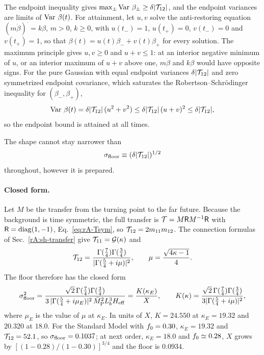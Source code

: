 \begin{rAproof}
The endpoint inequality gives $\max_\pm\operatorname{Var}\,\beta_\pm\geq\delta|\mathcal{T}_{12}|$, and the endpoint variances are limits of $\operatorname{Var}\,\beta(t)$.
For attainment, let $u,v$ solve the anti-restoring equation $(m\dot\beta)^{\boldsymbol\cdot}=k\beta$, $m>0$, $k\geq0$, with $u(t_-)=1$, $u(t_+)=0$, $v(t_-)=0$ and $v(t_+)=1$, so that $\beta(t)=u(t)\beta_-+v(t)\beta_+$ for every solution.
The maximum principle gives $u,v\geq0$ and $u+v\leq1$: at an interior negative minimum of $u$, or an interior maximum of $u+v$ above one, $m\ddot\beta$ and $k\beta$ would have opposite signs.
For the pure Gaussian with equal endpoint variances $\delta|\mathcal{T}_{12}|$ and zero symmetrized endpoint covariance, which saturates the Robertson--Schr\"odinger inequality for $(\beta_-,\beta_+)$,
\begin{equation}
\operatorname{Var}\,\beta(t)=\delta|\mathcal{T}_{12}|\,(u^2+v^2)\leq\delta|\mathcal{T}_{12}|\,(u+v)^2\leq\delta|\mathcal{T}_{12}| ,
\end{equation}
so the endpoint bound is attained at all times.
\end{rAproof}

The shape cannot stay narrower than
\begin{equation}
\sigma_{\mathrm{floor}}\equiv(\delta|\mathcal{T}_{12}|)^{1/2}
\end{equation}
throughout, however it is prepared.

\paragraph{Closed form.}
Let $M$ be the transfer from the turning point to the far future.
Because the background is time symmetric, the full transfer is $\mathcal{T}=M\mathsf RM^{-1}\mathsf R$ with $\mathsf R={\rm diag}(1,-1)$, Eq.~\eqref{eq:rA-Tsym}, so $\mathcal{T}_{12}=2m_{11}m_{12}$.
The connection formulas of Sec.~\ref{rA:sh-transfer} give $\mathcal{T}_{11}=\mathcal{G}(\kappa)$ and
\begin{equation}
\mathcal{T}_{12}=\frac{\Gamma(\tfrac74)\Gamma(\tfrac34)}{|\Gamma(\tfrac54+i\mu)|^2},\qquad
\mu=\frac{\sqrt{4\kappa-1}}{4}.
\label{eq:rA-T12b}
\end{equation}
The floor therefore has the closed form
\begin{equation}
\sigma_{\mathrm{floor}}^2=\frac{\sqrt2\,\Gamma(\tfrac74)\Gamma(\tfrac34)}{3\,|\Gamma(\tfrac54+i\mu_E)|^2\,\bar M_{\mathrm{P}}^2L_b^3H_{\mathrm{eff}}}=\frac{K(\kappa_E)}{X},\qquad K(\kappa)=\frac{\sqrt2\,\Gamma(\tfrac74)\Gamma(\tfrac34)}{3|\Gamma(\tfrac54+i\mu)|^2},
\label{eq:rA-floor}
\end{equation}
where $\mu_E$ is the value of $\mu$ at $\kappa_E$.
In units of $X$, $K=24.550$ at $\kappa_E=19.32$ and $20.320$ at $18.0$. %
For the Standard Model with $f_0=0.30$, $\kappa_E=19.32$ and $\mathcal{T}_{12}=52.1$, so $\sigma_{\mathrm{floor}}=0.1037$; at next order, $\kappa_E=18.0$ and $f_0\simeq0.28$, $X$ grows by $[(1-0.28)/(1-0.30)]^{3/4}$ and the floor is $0.0934$. %

